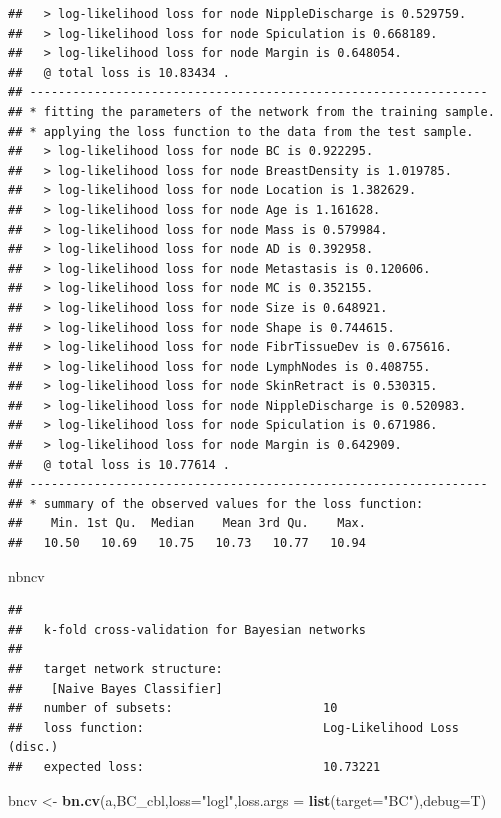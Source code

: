 \documentclass[]{article}
\newenvironment{Shaded}{\begin{snugshade}}{\end{snugshade}}
\newcommand{\KeywordTok}[1]{\textcolor[rgb]{0.13,0.29,0.53}{\textbf{{#1}}}}
\newcommand{\DataTypeTok}[1]{\textcolor[rgb]{0.13,0.29,0.53}{{#1}}}
\newcommand{\StringTok}[1]{\textcolor[rgb]{0.31,0.60,0.02}{{#1}}}
\newcommand{\NormalTok}[1]{{#1}}
\begin{document}
\begin{verbatim}
##   > log-likelihood loss for node NippleDischarge is 0.529759.
##   > log-likelihood loss for node Spiculation is 0.668189.
##   > log-likelihood loss for node Margin is 0.648054.
##   @ total loss is 10.83434 .
## ----------------------------------------------------------------
## * fitting the parameters of the network from the training sample.
## * applying the loss function to the data from the test sample.
##   > log-likelihood loss for node BC is 0.922295.
##   > log-likelihood loss for node BreastDensity is 1.019785.
##   > log-likelihood loss for node Location is 1.382629.
##   > log-likelihood loss for node Age is 1.161628.
##   > log-likelihood loss for node Mass is 0.579984.
##   > log-likelihood loss for node AD is 0.392958.
##   > log-likelihood loss for node Metastasis is 0.120606.
##   > log-likelihood loss for node MC is 0.352155.
##   > log-likelihood loss for node Size is 0.648921.
##   > log-likelihood loss for node Shape is 0.744615.
##   > log-likelihood loss for node FibrTissueDev is 0.675616.
##   > log-likelihood loss for node LymphNodes is 0.408755.
##   > log-likelihood loss for node SkinRetract is 0.530315.
##   > log-likelihood loss for node NippleDischarge is 0.520983.
##   > log-likelihood loss for node Spiculation is 0.671986.
##   > log-likelihood loss for node Margin is 0.642909.
##   @ total loss is 10.77614 .
## ----------------------------------------------------------------
## * summary of the observed values for the loss function:
##    Min. 1st Qu.  Median    Mean 3rd Qu.    Max. 
##   10.50   10.69   10.75   10.73   10.77   10.94
\end{verbatim}

\begin{Shaded}
\begin{Highlighting}[]
\NormalTok{nbncv}
\end{Highlighting}
\end{Shaded}

\begin{verbatim}
## 
##   k-fold cross-validation for Bayesian networks
## 
##   target network structure:
##    [Naive Bayes Classifier]
##   number of subsets:                     10 
##   loss function:                         Log-Likelihood Loss (disc.) 
##   expected loss:                         10.73221
\end{verbatim}

\begin{Shaded}
\begin{Highlighting}[]
\NormalTok{bncv <-}\StringTok{ }\KeywordTok{bn.cv}\NormalTok{(a,BC_cbl,}\DataTypeTok{loss=}\StringTok{"logl"}\NormalTok{,}\DataTypeTok{loss.args =} \KeywordTok{list}\NormalTok{(}\DataTypeTok{target=}\StringTok{"BC"}\NormalTok{),}\DataTypeTok{debug=}\NormalTok{T)}
\end{Highlighting}
\end{Shaded}
\end{document}

